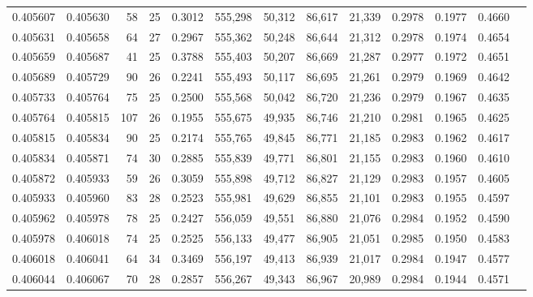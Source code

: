 \begin{tabular}{rrrrrrrrrrrrr}
0.405607 & 0.405630 &    58 &  25 &                                     0.3012 & 555,298 &  50,312 &  86,617 &  21,339 & 0.2978 & 0.1977 & 0.4660 \\
0.405631 & 0.405658 &    64 &  27 &                                     0.2967 & 555,362 &  50,248 &  86,644 &  21,312 & 0.2978 & 0.1974 & 0.4654 \\
0.405659 & 0.405687 &    41 &  25 &                                     0.3788 & 555,403 &  50,207 &  86,669 &  21,287 & 0.2977 & 0.1972 & 0.4651 \\
0.405689 & 0.405729 &    90 &  26 &                                     0.2241 & 555,493 &  50,117 &  86,695 &  21,261 & 0.2979 & 0.1969 & 0.4642 \\
0.405733 & 0.405764 &    75 &  25 &                                     0.2500 & 555,568 &  50,042 &  86,720 &  21,236 & 0.2979 & 0.1967 & 0.4635 \\
0.405764 & 0.405815 &   107 &  26 &                                     0.1955 & 555,675 &  49,935 &  86,746 &  21,210 & 0.2981 & 0.1965 & 0.4625 \\
0.405815 & 0.405834 &    90 &  25 &                                     0.2174 & 555,765 &  49,845 &  86,771 &  21,185 & 0.2983 & 0.1962 & 0.4617 \\
0.405834 & 0.405871 &    74 &  30 &                                     0.2885 & 555,839 &  49,771 &  86,801 &  21,155 & 0.2983 & 0.1960 & 0.4610 \\
0.405872 & 0.405933 &    59 &  26 &                                     0.3059 & 555,898 &  49,712 &  86,827 &  21,129 & 0.2983 & 0.1957 & 0.4605 \\
0.405933 & 0.405960 &    83 &  28 &                                     0.2523 & 555,981 &  49,629 &  86,855 &  21,101 & 0.2983 & 0.1955 & 0.4597 \\
0.405962 & 0.405978 &    78 &  25 &                                     0.2427 & 556,059 &  49,551 &  86,880 &  21,076 & 0.2984 & 0.1952 & 0.4590 \\
0.405978 & 0.406018 &    74 &  25 &                                     0.2525 & 556,133 &  49,477 &  86,905 &  21,051 & 0.2985 & 0.1950 & 0.4583 \\
0.406018 & 0.406041 &    64 &  34 &                                     0.3469 & 556,197 &  49,413 &  86,939 &  21,017 & 0.2984 & 0.1947 & 0.4577 \\
0.406044 & 0.406067 &    70 &  28 &                                     0.2857 & 556,267 &  49,343 &  86,967 &  20,989 & 0.2984 & 0.1944 & 0.4571 \\

\end{tabular}
